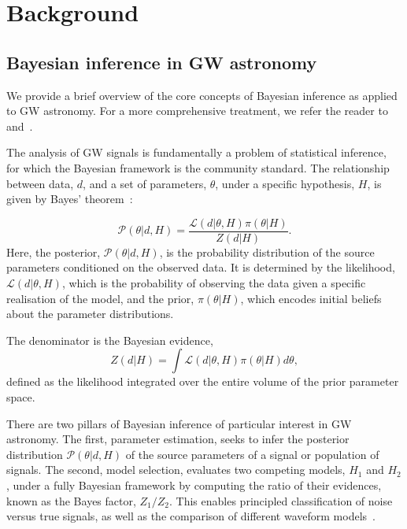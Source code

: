 \documentclass[fleqn,usenatbib]{mnras}
\begin{document}
\section{Background}
\label{sec:background}

\subsection{Bayesian inference in GW astronomy}
\label{sec:background_bayes}
We provide a brief overview of the core concepts of
Bayesian inference as applied to GW astronomy. For a more
comprehensive treatment, we refer the reader to~\cite{skilling, Thrane_2019, lal, bilby_paper}
and~\cite{LIGO_guide_signalextraction}.

The analysis of GW signals is fundamentally a problem of statistical
inference, for which the Bayesian framework is the community standard.
The relationship between data, $d$, and a set of parameters,
$\theta$, under a specific hypothesis, $H$, is given by Bayes' theorem~\citep{Bayes1763}:

\begin{equation}
    \mathcal{P}(\theta|d, H) = \frac{\mathcal{L}(d|\theta, H) \pi(\theta|H)}{Z(d|H)}.
    \label{eq:bayes_theorem}
\end{equation}%
Here, the posterior, $\mathcal{P}(\theta|d, H)$, is the probability distribution
of the source parameters conditioned on the observed data. It is
determined by the likelihood, $\mathcal{L}(d|\theta, H)$, which is the
probability of observing the data given a specific realisation of the
model, and the prior, $\pi(\theta|H)$, which encodes initial beliefs
about the parameter distributions.

The denominator is the Bayesian evidence,
\begin{equation}
    Z(d|H) = \int \mathcal{L}(d|\theta, H) \pi(\theta|H) d\theta,
    \label{eq:evidence}
\end{equation}
defined as the likelihood integrated over the entire volume of the
prior parameter space.

There are two pillars of Bayesian inference of particular interest
in GW astronomy. The first, parameter estimation, seeks to infer 
the posterior distribution $\mathcal{P}(\theta|d, H)$ of the source parameters of a signal or population of signals.
The second, model selection, evaluates two competing
models, $H_1$ and $H_2$, under a fully Bayesian framework by computing the ratio of
their evidences, known as the Bayes factor, $Z_1 / Z_2$. This enables
principled classification of noise versus true signals, as well as the 
comparison of different waveform models~\citep{LIGO_guide_signalextraction}.
\end{document}
